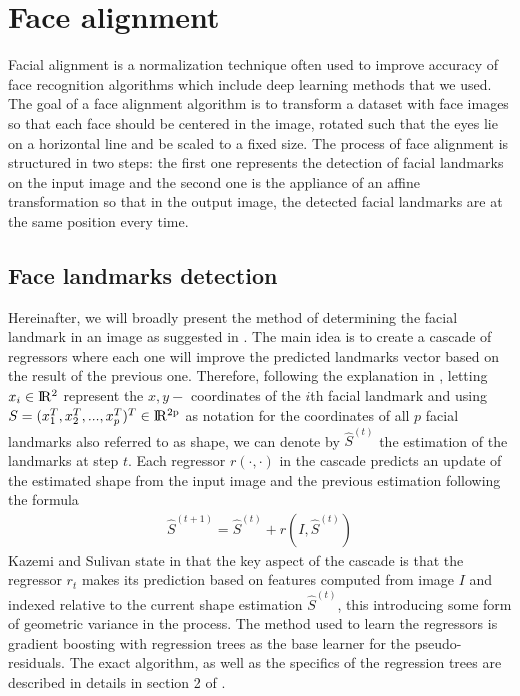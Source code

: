 \section{Face alignment}
Facial alignment is a normalization technique often used to improve accuracy of face recognition algorithms which include deep learning methods that we used. The goal of a face alignment algorithm is to transform a dataset with face images so that each face should be centered in the image, rotated such that the eyes lie on a horizontal line and be scaled to a fixed size.
The process of face alignment is structured in two steps: the first one represents the detection of facial landmarks on the input image and the second one is the appliance of an affine transformation so that in the output image, the detected facial landmarks are at the same position every time.
\subsection{Face landmarks detection}
Hereinafter, we will broadly present the method of determining the facial landmark in an image as suggested in \cite{kazemi2014one}. The main idea is to create a cascade of regressors where each one will improve the predicted landmarks vector based on the result of the previous one. Therefore, following the explanation in \cite{kazemi2014one}, letting $x_{i} \in \rm I\!R^{2}$ represent the $x,y - $ coordinates of the $i$th facial landmark and using $S = (x_{1}^{T}, x_{2}^{T}, ..., x_{p}^{T})^{T} \in \rm I\!R^{2p}$ as notation for the coordinates of all $p$ facial landmarks also referred to as shape, we can denote by $\hat{S}^{(t)}$ the estimation of the landmarks at step $t$. Each regressor $r(\cdot, \cdot)$ in the cascade predicts an update of the estimated shape from the input image and the previous estimation following the formula 
\begin{align}
	\hat{S}^{(t+1)} = \hat{S}^{(t)} + r(I, \hat{S}^{(t)})
\end{align}
Kazemi and Sulivan state in \cite{kazemi2014one} that the key aspect of the cascade is that the regressor $r_{t}$ makes its prediction based on features computed from image $I$ and indexed relative to the current shape estimation $\hat{S}^{(t)}$, this introducing some form of geometric variance in the process. The method used to learn the regressors is gradient boosting with regression trees as the base learner for the pseudo-residuals. The exact algorithm, as well as the specifics of the regression trees are described in details in section 2 of \cite{kazemi2014one}.

